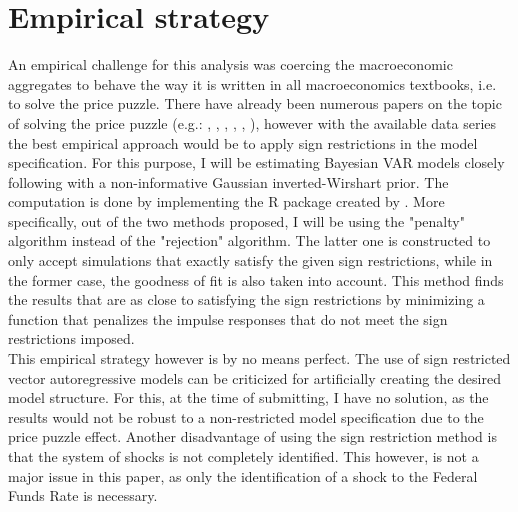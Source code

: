 \documentclass[12pt,a4paper]{article}
\begin{document}
\section{Empirical strategy}
An empirical challenge for this analysis was coercing the macroeconomic aggregates to behave the way it is written in all macroeconomics textbooks, i.e. to solve the price puzzle. 
There have already been numerous papers on the topic of solving the price puzzle (e.g.: \textcolor{blue}{\cite{RePEc:eee:moneco:v:51:y:2004:i:7:p:1385-1413}}, \textcolor{blue}{\cite{RePEc:hhs:hastef:0414}}, \textcolor{blue}{\cite{RePEc:spr:empeco:v:46:y:2014:i:2:p:701-731}}, \textcolor{blue}{\cite{RePEc:rba:rbardp:rdp2017-02}}, \textcolor{blue}{\cite{RePEc:aea:aejmac:v:8:y:2016:i:4:p:75-102}}, \textcolor{blue}{\cite{RePEc:aea:aecrev:v:94:y:2004:i:4:p:1055-1084}}), however with the available data series the best empirical approach would be to apply sign restrictions in the model specification. For this purpose, I will be estimating Bayesian VAR models closely following \textcolor{blue}{\cite{RePEc:eee:moneco:v:52:y:2005:i:2:p:381-419}} with a non-informative Gaussian inverted-Wirshart prior. The computation is done by implementing the R package created by \textcolor{blue}{\cite{Danne2015}}. More specifically, out of the two methods proposed, I will be using the "penalty" algorithm instead of the "rejection" algorithm. The latter one is constructed to only accept simulations that exactly satisfy the given sign restrictions, while in the former case, the goodness of fit is also taken into account. This method finds the results that are as close to satisfying the sign restrictions by minimizing a function that penalizes the impulse responses that do not meet the sign restrictions imposed.\\ 

This empirical strategy however is by no means perfect. The use of sign restricted vector autoregressive models can be criticized for artificially creating the desired model structure. For this, at the time of submitting, I have no solution, as the results would not be robust to a non-restricted model specification due to the price puzzle effect. Another disadvantage of using the sign restriction method is that the system of shocks is not completely identified. This however, is not a major issue in this paper, as only the identification of a shock to the Federal Funds Rate is necessary.\\
\end{document}
